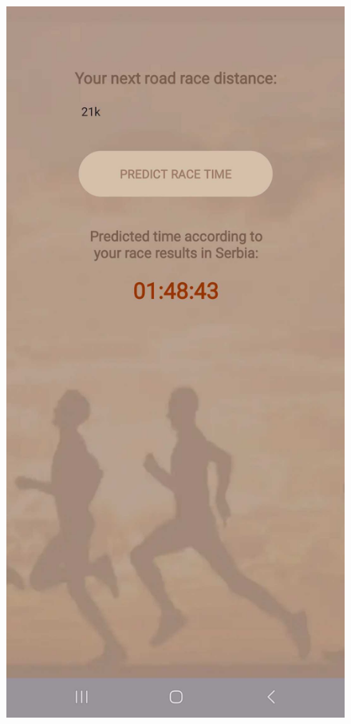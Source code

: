 \documentclass[12pt,oneside]{memoir}
\begin{document}
\begin{figure}[H]
\begin{minipage}{0.27\textwidth}
  \end{minipage}
  \hfill
  \begin{minipage}{0.27\textwidth}
    \centering
    \includegraphics[width=\textwidth]{assets/pictures/app_screenshots/race_prediction_2.jpg}

\end{minipage}
\end{figure}
\end{document}
